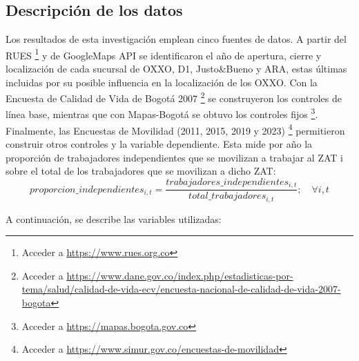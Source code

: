 \documentclass{article}
\begin{document}
\subsection{Descripción de los datos}
Los resultados de esta investigación emplean cinco fuentes de datos. A partir del RUES \footnote{Acceder a \url{ https://www.rues.org.co}} y de GoogleMaps API se identificaron el año de apertura, cierre y localización de cada sucursal de OXXO, D1, Justo\&Bueno y ARA, estas últimas incluidas por su posible influencia en la localización de los OXXO. Con la Encuesta de Calidad de Vida de Bogotá 2007 \footnote{Acceder a \url{https://www.dane.gov.co/index.php/estadisticas-por-tema/salud/calidad-de-vida-ecv/encuesta-nacional-de-calidad-de-vida-2007-bogota}} se construyeron los controles de línea base, mientras que con Mapas-Bogotá se obtuvo los controles fijos \footnote{Acceder a \url{https://mapas.bogota.gov.co}}. Finalmente, las Encuestas de Movilidad (2011, 2015, 2019 y 2023) \footnote{Acceder a \url{https://www.simur.gov.co/encuestas-de-movilidad}} permitieron construir otros controles y la variable dependiente. Esta mide por año la proporción de trabajadores independientes que se movilizan a trabajar al ZAT i sobre el total de los trabajadores que se movilizan a dicho ZAT:\\

\begin{equation}
    proporcion\_independientes_{i,t}=\frac{trabajadores\_independientes_{i,t}}{total\_trabajadores_{i,t}} ; \quad \forall i, t
\end{equation}


A continuación, se describe las variables utilizadas:
\end{document}
